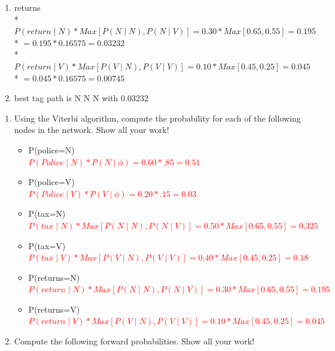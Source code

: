 \documentclass[11pt]{article}
\begin{document}
\begin{enumerate}
\begin {enumerate}
  \item[] returns
  \\* \quad  $ P(return\mid N)*Max[P(N \mid N),P(N \mid V)]=0.30 *Max[0.65,0.55]= 0.195$
  \\* \quad  $ =0.195*0.16575= 0.03232$
  \\* \quad  $ P(return\mid V)*Max[P(V \mid N),P(V \mid V)]=0.10 *Max[0.45,0.25]= 0.045$
  \\* \quad  $ =0.045*0.16575= 0.00745$
  \item[] best tag path is N N N with 0.03232

\end{enumerate}

\newpage

\begin{enumerate}
\item Using the Viterbi algorithm, compute the probability for each of the
following nodes in the network. Show all your work! \\

\begin{itemize}

\item P(police=N)  \\
\textcolor{red}{\quad  $ P(Police\mid N)*P(N\mid\phi)=0.60 * .85= 0.51$}
\item P(police=V)  \\
\textcolor{red}{\quad  $ P(Police\mid V)*P(V\mid\phi)=0.20 * .15= 0.03$}
\item P(tax=N) \\
\textcolor{red}{\quad  $ P(tax\mid N)*Max[P(N \mid N),P(N \mid V)]=0.50 *Max[0.65,0.55]= 0.325$}
\item P(tax=V) \\
\textcolor{red}{\quad  $ P(tax\mid V)*Max[P(V \mid N),P(V \mid V)]=0.40 *Max[0.45,0.25]= 0.18$}
\item P(returns=N) \\
\textcolor{red}{ \quad  $ P(return\mid N)*Max[P(N \mid N),P(N \mid V)]=0.30 *Max[0.65,0.55]= 0.195$}
\item P(returns=V) \\
\textcolor{red}{\quad  $ P(return\mid V)*Max[P(V \mid N),P(V \mid V)]=0.10 *Max[0.45,0.25]= 0.045$}
\end{itemize}


\newpage
\item Compute the following forward probabilities.  Show all your work! \\


\end{enumerate}
\end{enumerate}
\end{document}
